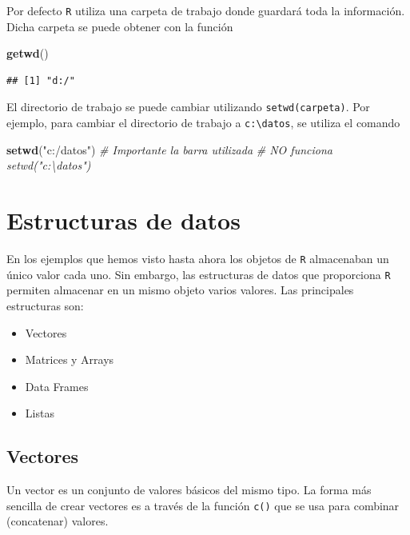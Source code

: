 \documentclass[]{book}
\newenvironment{Shaded}{\begin{snugshade}}{\end{snugshade}}
\newcommand{\CommentTok}[1]{\textcolor[rgb]{0.56,0.35,0.01}{\textit{#1}}}
\newcommand{\KeywordTok}[1]{\textcolor[rgb]{0.13,0.29,0.53}{\textbf{#1}}}
\newcommand{\NormalTok}[1]{#1}
\newcommand{\StringTok}[1]{\textcolor[rgb]{0.31,0.60,0.02}{#1}}
\begin{document}
Por defecto \texttt{R} utiliza
una carpeta de trabajo donde guardará toda la información. Dicha carpeta
se puede obtener con la función

\begin{Shaded}
\begin{Highlighting}[]
\KeywordTok{getwd}\NormalTok{() }
\end{Highlighting}
\end{Shaded}

\begin{verbatim}
## [1] "d:/"
\end{verbatim}

El directorio de trabajo se puede cambiar utilizando \texttt{setwd(carpeta)}.
Por ejemplo, para cambiar el directorio de trabajo a \texttt{c:\textbackslash{}datos},
se utiliza el comando

\begin{Shaded}
\begin{Highlighting}[]
\KeywordTok{setwd}\NormalTok{(}\StringTok{"c:/datos"}\NormalTok{)}
\CommentTok{# Importante la barra utilizada}
\CommentTok{# NO funciona setwd("c:\textbackslash{}datos")}
\end{Highlighting}
\end{Shaded}

\hypertarget{estructuras-de-datos}{%
\chapter{Estructuras de datos}\label{estructuras-de-datos}}

En los ejemplos que hemos visto hasta ahora los objetos
de \texttt{R} almacenaban un único valor cada uno. Sin embargo, las estructuras
de datos que proporciona \texttt{R} permiten
almacenar en un mismo objeto varios valores. Las principales estructuras
son:

\begin{itemize}
\item
  Vectores
\item
  Matrices y Arrays
\item
  Data Frames
\item
  Listas
\end{itemize}

\hypertarget{vectores}{%
\section{Vectores}\label{vectores}}

Un vector es un conjunto de valores básicos del mismo tipo.
La forma más sencilla de crear vectores es a
través de la función \texttt{c()} que se usa para combinar (concatenar) valores.
\end{document}
